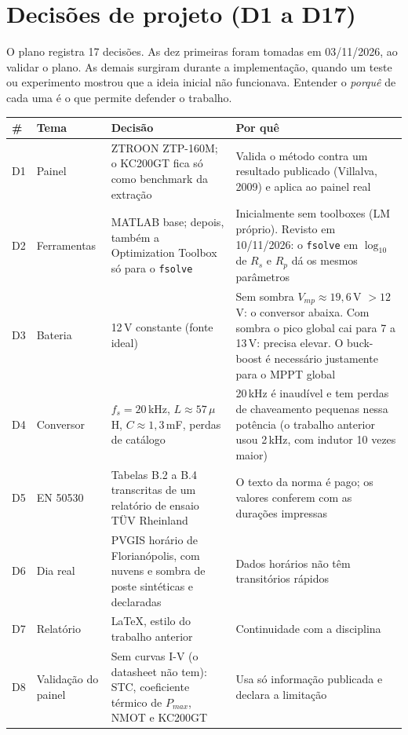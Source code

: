 \section{Decis\~oes de projeto (D1 a D17)}\label{sec:decisoes}

O plano registra 17 decis\~oes. As dez primeiras foram tomadas em 03/11/2026, ao validar o plano.
As demais surgiram durante a implementa\c{c}\~ao, quando um teste ou experimento mostrou que a
ideia inicial n\~ao funcionava. Entender o \emph{porqu\^e} de cada uma \'e o que permite defender
o trabalho.

{\small
\begin{longtable}{@{}p{0.7cm}p{2.5cm}p{5.6cm}p{6.6cm}@{}}
\toprule
\# & Tema & Decis\~ao & Por qu\^e \\ \midrule \endhead
D1 & Painel & ZTROON ZTP-160M; o KC200GT fica s\'o como benchmark da extra\c{c}\~ao
  & Valida o m\'etodo contra um resultado publicado (Villalva, 2009) e aplica ao painel real \\
D2 & Ferramentas & MATLAB base; depois, tamb\'em a Optimization Toolbox s\'o para o \texttt{fsolve} & Inicialmente sem toolboxes (LM pr\'oprio). Revisto em 10/11/2026: o \texttt{fsolve} em $\log_{10}$ de $R_s$ e $R_p$ d\'a os mesmos par\^ametros \\
D3 & Bateria & 12\,V constante (fonte ideal)
  & Sem sombra $V_{mp}\approx19{,}6$\,V $>12$\,V: o conversor abaixa. Com sombra o pico global cai para 7 a 13\,V: precisa elevar. O buck-boost \'e necess\'ario justamente para o MPPT global \\
D4 & Conversor & $f_s=20$\,kHz, $L\approx57\,\mu$H, $C\approx1{,}3$\,mF, perdas de cat\'alogo
  & 20\,kHz \'e inaud\'ivel e tem perdas de chaveamento pequenas nessa pot\^encia (o trabalho anterior usou 2\,kHz, com indutor 10 vezes maior) \\
D5 & EN 50530 & Tabelas B.2 a B.4 transcritas de um relat\'orio de ensaio T\"UV Rheinland
  & O texto da norma \'e pago; os valores conferem com as dura\c{c}\~oes impressas \\
D6 & Dia real & PVGIS hor\'ario de Florian\'opolis, com nuvens e sombra de poste sint\'eticas e declaradas
  & Dados hor\'arios n\~ao t\^em transit\'orios r\'apidos \\
D7 & Relat\'orio & \LaTeX, estilo do trabalho anterior & Continuidade com a disciplina \\
D8 & Valida\c{c}\~ao do painel & Sem curvas I-V (o datasheet n\~ao tem): STC, coeficiente t\'ermico de $P_{max}$, NMOT e KC200GT
  & Usa s\'o informa\c{c}\~ao publicada e declara a limita\c{c}\~ao \\

\end{longtable}}
